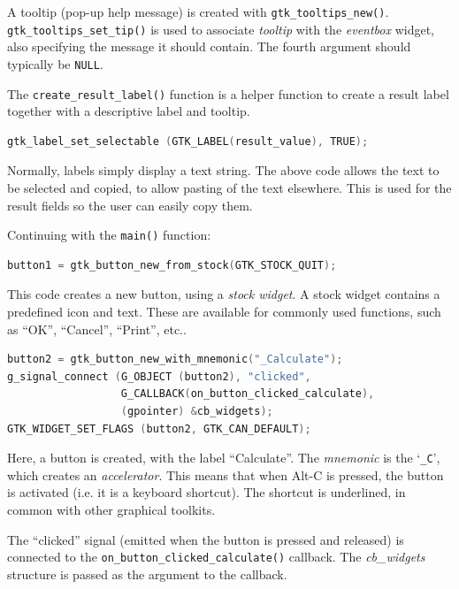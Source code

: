 \documentclass[a4paper,oneside]{article}
\newcommand{\variable}[1]{\textsl{#1}}
\newcommand{\function}[1]{\texttt{#1()}}
\newcommand{\code}[1]{\texttt{#1}}
\begin{document}
A tooltip (pop-up help message) is created with
\function{gtk\_tooltips\_new}.  \function{gtk\_tooltips\_set\_tip} is
used to associate \variable{tooltip} with the \variable{eventbox}
widget, also specifying the message it should contain.  The fourth
argument should typically be \code{NULL}.

The \function{create\_result\_label} function is a helper function to
create a result label together with a descriptive label and tooltip.

\begin{lstlisting}[numbers=none, language=C]
gtk_label_set_selectable (GTK_LABEL(result_value), TRUE);
\end{lstlisting}

Normally, labels simply display a text string.  The above code allows
the text to be selected and copied, to allow pasting of the text
elsewhere.  This is used for the result fields so the user can easily
copy them.

Continuing with the \function{main} function:

\begin{lstlisting}[numbers=none, language=C]
button1 = gtk_button_new_from_stock(GTK_STOCK_QUIT);
\end{lstlisting}

This code creates a new button, using a \emph{stock widget}.  A stock
widget contains a predefined icon and text.  These are available for
commonly used functions, such as ``OK'', ``Cancel'', ``Print'', etc..

\begin{lstlisting}[numbers=none, language=C]
button2 = gtk_button_new_with_mnemonic("_Calculate");
g_signal_connect (G_OBJECT (button2), "clicked",
                  G_CALLBACK(on_button_clicked_calculate),
                  (gpointer) &cb_widgets);
GTK_WIDGET_SET_FLAGS (button2, GTK_CAN_DEFAULT);
\end{lstlisting}

Here, a button is created, with the label ``Calculate''.  The
\emph{mnemonic} is the `\code{\_C}', which creates an
\emph{accelerator}.  This means that when Alt-C is pressed, the button
is activated (i.e. it is a keyboard shortcut).  The shortcut is
underlined, in common with other graphical toolkits.

The ``clicked'' signal (emitted when the button is pressed and
released) is connected to the
\function{on\_button\_clicked\_calculate} callback.  The
\variable{cb\_widgets} structure is passed as the argument to the
callback.
\end{document}
